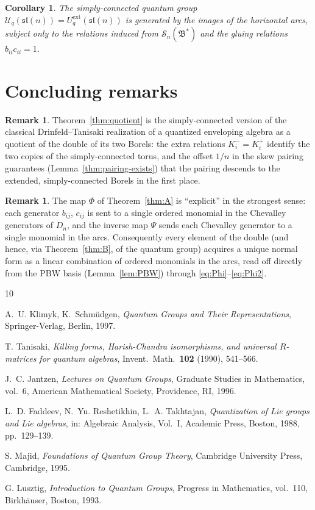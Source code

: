 \documentclass[11pt]{amsart}
\newcommand{\U}{\mathscr U}
\newcommand{\sl}{\mathfrak{sl}}
\newcommand{\KP}{K^{+}}
\newcommand{\KM}{K^{-}}
\theoremstyle{plain}
\newtheorem{corollary}[theorem]{Corollary}
\theoremstyle{definition}
\newtheorem{remark}[theorem]{Remark}
\numberwithin{equation}{section}
\begin{document}
\begin{corollary}
The simply-connected quantum group $\U_q(\sl(n))=U_q^{\mathrm{ext}}(\sl(n))$
is generated by the images of the horizontal arcs, subject only to the
relations induced from $\mathscr S_n(\mathfrak B^*)$ and the gluing
relations $b_{ii}c_{ii}=1$.
\end{corollary}

\section{Concluding remarks}

\begin{remark}
Theorem~\ref{thm:quotient} is the simply-connected version of the classical
Drinfeld--Tanisaki realization of a quantized enveloping algebra as a
quotient of the double of its two Borels: the extra relations
$\KM_i=\KP_i$ identify the two copies of the simply-connected torus, and the
offset $1/n$ in the skew pairing guarantees (Lemma~\ref{thm:pairing-exists})
that the pairing descends to the extended, simply-connected Borels in the
first place.
\end{remark}

\begin{remark}
The map $\Phi$ of Theorem~\ref{thm:A} is ``explicit'' in the strongest sense:
each generator $b_{ij}$, $c_{ij}$ is sent to a single ordered monomial in the
Chevalley generators of $D_n$, and the inverse map $\Psi$ sends each
Chevalley generator to a single monomial in the arcs.  Consequently every
element of the double (and hence, via Theorem~\ref{thm:B}, of the quantum
group) acquires a unique normal form as a linear combination of ordered
monomials in the arcs, read off directly from the PBW basis
(Lemma~\ref{lem:PBW}) through \eqref{eq:Phi}--\eqref{eq:Phi2}.
\end{remark}

\begin{thebibliography}{10}

A.~U. Klimyk, K.~Schm\"udgen,
\emph{Quantum Groups and Their Representations},
Springer-Verlag, Berlin, 1997.

T. Tanisaki,
\emph{Killing forms, Harish-Chandra isomorphisms, and universal
$R$-matrices for quantum algebras},
Invent.\ Math.\ \textbf{102} (1990), 541--566.

J.~C. Jantzen,
\emph{Lectures on Quantum Groups},
Graduate Studies in Mathematics, vol.~6, American Mathematical Society,
Providence, RI, 1996.

L.~D. Faddeev, N.~Yu. Reshetikhin, L.~A. Takhtajan,
\emph{Quantization of Lie groups and Lie algebras},
in: Algebraic Analysis, Vol.~I, Academic Press, Boston, 1988, pp.~129--139.

S. Majid,
\emph{Foundations of Quantum Group Theory},
Cambridge University Press, Cambridge, 1995.

G. Lusztig,
\emph{Introduction to Quantum Groups},
Progress in Mathematics, vol.~110, Birkh\"auser, Boston, 1993.

\end{thebibliography}
\end{document}
